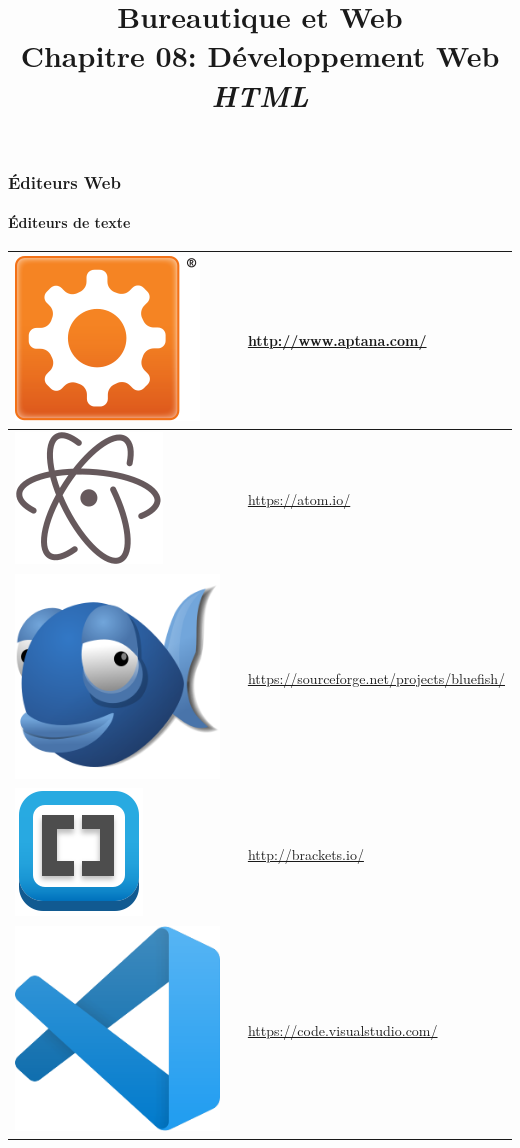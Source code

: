 \documentclass[xcolor=table]{beamer}
\title[BWEB: 08- Web (HTML)] %
{Bureautique et Web \\Chapitre 08: Développement Web\\ \slshape\small  HTML}
\begin{document}
\begin{frame}
\frametitle{Éditeurs Web}
\framesubtitle{Éditeurs de texte}

\def\arraystretch{0}

\begin{tabular}{p{}cp{}}%
	
	\hline
	
	\includegraphics[height=.8cm]{..//img/Bweb08-dev-web/aptana-logo.png} &
	& 
	\url{http://www.aptana.com/}\\
	
	\hline
	
	\includegraphics[height=.8cm]{..//img/Bweb08-dev-web/atom-logo.png} &
	& 
	\url{https://atom.io/}\\
	
	\hline
	
	\includegraphics[height=.8cm]{..//img/Bweb08-dev-web/bluefish-logo.png} &
	& 
	\url{https://sourceforge.net/projects/bluefish/}\\
	
	\hline
	
	\includegraphics[height=.8cm]{..//img/Bweb08-dev-web/brackets-logo.png} &
	& 
	\url{http://brackets.io/}\\
	
	\hline
	
	\includegraphics[height=.8cm]{..//img/Bweb08-dev-web/visual-studio-code-logo.png} &
	& 
	\url{https://code.visualstudio.com/}\\
	
	\hline
	
\end{tabular}

\end{frame}
\end{document}
